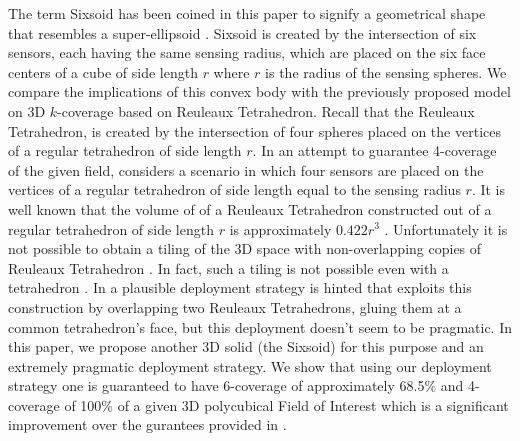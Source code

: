 \documentclass[conference]{IEEEtran}
\begin{document}
The term Sixsoid has been coined in this paper to signify a geometrical shape that resembles a super-ellipsoid \cite{W}. 
Sixsoid is created by the intersection of six sensors, each having the same sensing radius, which are placed on the six face centers of a cube of side length $r$ where $r$ is the radius of the sensing spheres. We compare the implications of this convex body with the previously proposed model on 3D $k$-coverage based on Reuleaux Tetrahedron. Recall that the Reuleaux Tetrahedron, is created by the intersection of four spheres placed on the vertices of a regular tetrahedron of side length $r$. In an attempt to guarantee 4-coverage of the given field, \cite{AD1} considers a scenario in which four sensors are placed on the vertices of a regular tetrahedron of side length equal to the sensing radius $r$. It is well known that the volume of 
of a Reuleaux Tetrahedron constructed out of a regular tetrahedron of side length $r$ is approximately $0.422r^3$ \cite{RT}. Unfortunately it is not
possible to obtain a tiling of the 3D space with non-overlapping copies of Reuleaux Tetrahedron \cite{A}. In fact, such a tiling is not
possible even with a tetrahedron \cite{MW}. In \cite{A} a plausible deployment strategy is hinted that exploits this construction by overlapping two Reuleaux Tetrahedrons, gluing them at a common tetrahedron's face, but this deployment doesn't seem to be pragmatic.  In this paper, we propose another 3D solid (the Sixsoid) for this purpose and an extremely pragmatic deployment strategy. We show that using our deployment strategy one is guaranteed to have 6-coverage of approximately 68.5\% and 4-coverage of 100\%  of a given 3D polycubical Field of Interest which is a significant improvement over the gurantees provided in \cite{A, AD1}.
\end{document}

